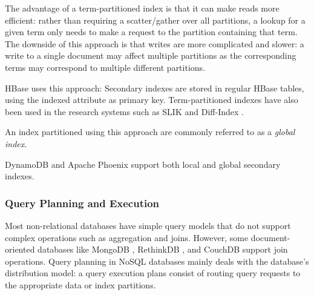The advantage of a term-partitioned index is that it can make reads more efficient:
rather than requiring a scatter/gather over all partitions, a lookup for a given term only needs to make a request to the
partition containing that term.
The downside of this approach is that writes are more complicated and slower:
a write to a single document may affect multiple partitions as the corresponding terms may correspond to multiple
different partitions.

HBase \cite{hbase:secondaryindexes} uses this approach:
Secondary indexes are stored in regular HBase tables, using the indexed attribute as primary key.
Term-partitioned indexes have also been used in the research systems such as SLIK \cite{kejriwal:slik}
and Diff-Index \cite{tan:diffindex}.


An index partitioned using this approach are commonly referred to as a \textit{global index}.

\medskip
\noindent
DynamoDB \cite{dynamodb:secondaryindexes} and Apache Phoenix \cite{phoenix:secondaryidnexing} support both local and global secondary indexes.

\subsubsection{Query Planning and Execution}

Most non-relational databases have simple query models that do not support complex operations such as aggregation and
joins.
However, some document-oriented databases like MongoDB \cite{mongodb:joins}, RethinkDB \cite{rethinkdb:joins},
and CouchDB \cite{couchdb:joins} support join operations.
Query planning in NoSQL databases mainly deals with the database's distribution model:
a query execution plans consist of routing query requests to the appropriate data or index partitions.
